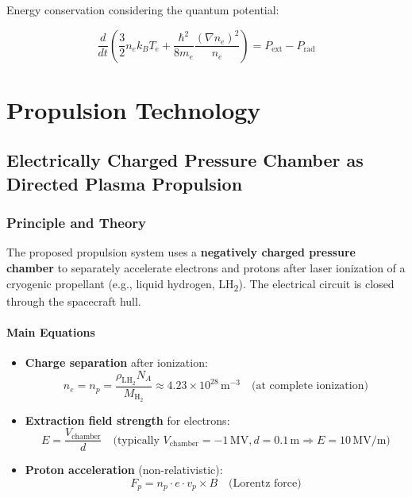 Energy conservation considering the quantum potential:

\begin{equation}
\label{eq:energy}
\frac{d}{dt}\left(\frac{3}{2}n_e k_B T_e + \frac{\hbar^2}{8m_e} \frac{(\nabla n_e)^2}{n_e}\right) = P_{\text{ext}} - P_{\text{rad}}
\end{equation}

\chapter{Propulsion Technology}
\section{Electrically Charged Pressure Chamber as Directed Plasma Propulsion}
\label{sec:plasma-antrieb}

\subsection{Principle and Theory}
The proposed propulsion system uses a \textbf{negatively charged pressure chamber} to separately accelerate electrons and protons after laser ionization of a cryogenic propellant (e.g., liquid hydrogen, LH\textsubscript{2}). The electrical circuit is closed through the spacecraft hull.

\subsubsection*{Main Equations}
\begin{itemize}
    \item \textbf{Charge separation} after ionization:
        \begin{equation}
            n_e = n_p = \frac{\rho_{\text{LH}_2} N_A}{M_{\text{H}_2}} \approx 4.23 \times 10^{28}\,\text{m}^{-3} \quad \text{(at complete ionization)}
            \label{eq:density}
        \end{equation}
    
    \item \textbf{Extraction field strength} for electrons:
        \begin{equation}
            E = \frac{V_{\text{chamber}}}{d} \quad \text{(typically } V_{\text{chamber}} = -1\,\text{MV}, d = 0.1\,\text{m} \Rightarrow E = 10\,\text{MV/m})
            \label{eq:field}
        \end{equation}
    
    \item \textbf{Proton acceleration} (non-relativistic):
        \begin{equation}
            F_p = n_p \cdot e \cdot v_p \times B \quad \text{(Lorentz force)}
            \label{eq:lorentz_2}
        \end{equation}
\end{itemize}


